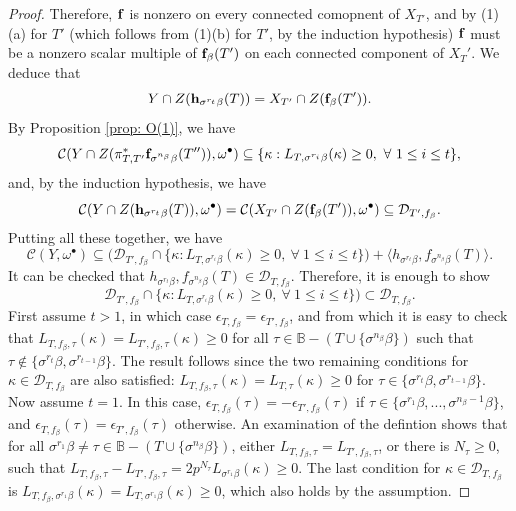 \documentclass[11pt,pdflatex]{amsart}
\theoremstyle{plain}
\theoremstyle{definition}
\theoremstyle{plain}
\theoremstyle{definition}
\theoremstyle{remark}
\numberwithin{equation}{section}
\numberwithin{figure}{section} \numberwithin{table}{subsection}
\newcommand{\calC}{{\mathcal{C}}}
\newcommand{\calD}{{\mathcal{D}}}
\def\BB{\mathbb{B}}
\begin{document}
\begin{proof}
 Therefore,  $\bf f$ is nonzero on every connected comopnent of $X_{T'}$, and by (1)(a) for $T'$ (which follows from  (1)(b) for $T'$, by the induction hypothesis) $\bf f$ must be a nonzero scalar multiple of ${\bf f}_\beta(T')$ on each connected component of $X_T'$. We deduce that  $$Y\cap Z({\bf h}_{\sigma^{r_t}\beta}(T))=X_{T'} \cap Z({\bf f}_\beta(T')).$$
  By Proposition \ref{prop: O(1)}, we have 
$$\calC(Y \cap Z(\pi_{T,T'}^*{\bf f}_{\sigma^{n_\beta}\beta}(T'')),\omega^\bullet) \subseteq  \{\kappa: L_{T,\sigma^{r_i}\beta}(\kappa)\geq 0,\ \forall \ 1 \leq i \leq t\},$$  
and, by the induction hypothesis, we have  $$\calC(Y\cap Z({\bf h}_{\sigma^{r_t}\beta}(T)),\omega^\bullet)=\calC(X_{T'} \cap Z({\bf f}_\beta(T')),\omega^\bullet) \subseteq\calD_{T',f_\beta}.$$ Putting all these together, we have 
$$\calC(Y,\omega^\bullet) \subseteq  \big( \calD_{T',f_\beta} \cap   \{\kappa: L_{T,\sigma^{r_i}\beta}(\kappa)\geq 0,\ \forall \ 1 \leq i \leq t\}\big) +\langle h_{\sigma^{r_t}\beta}, f_{\sigma^{n_\beta}\beta}(T) \rangle.$$ 
It can be checked that $h_{\sigma^{r_t}\beta}, f_{\sigma^{n_\beta}\beta}(T) \in \calD_{T,f_\beta}$. Therefore, it is enough to show $$\calD_{T',f_\beta} \cap   \{\kappa: L_{T,\sigma^{r_i}\beta}(\kappa)\geq 0,\ \forall \ 1 \leq i \leq t\}\big)  \subset \calD_{T,f_\beta}.$$
First assume $t>1$, in which case $\epsilon_{T,f_\beta}=\epsilon_{T',f_\beta}$, and from which it  is easy to check that $L_{T,f_\beta,\tau}(\kappa)=L_{T',f_\beta,\tau}(\kappa)\geq 0$ for all $\tau \in \BB-(T\cup\{\sigma^{n_\beta}\beta\})$ such that $\tau \not \in \{\sigma^{r_t}\beta, \sigma^{r_{t-1}}\beta\}$. The result follows since the two remaining conditions for $\kappa\in \calD_{T,f_\beta}$ are also satisfied: $L_{T,f_\beta,\tau}(\kappa)=L_{T,\tau}(\kappa)\geq 0$ for $\tau \in \{\sigma^{r_t}\beta, \sigma^{r_{t-1}}\beta\}$. Now assume $t=1$. In this case, $\epsilon_{T,f_\beta}(\tau)=-\epsilon_{T',f_\beta}(\tau)$ if $\tau \in \{\sigma^{r_1}\beta,...,\sigma^{n_\beta-1}\beta\}$, and $\epsilon_{T,f_\beta}(\tau)=\epsilon_{T',f_\beta}(\tau)$ otherwise. An examination of the defintion shows that for all $\sigma^{r_1}\beta \neq \tau  \in \BB-(T\cup\{\sigma^{n_\beta}\beta\})$, either $L_{T,f_\beta,\tau}=L_{T',f_\beta,\tau}$, or there is $N_\tau \geq 0$, such that  $L_{T,f_\beta,\tau}-L_{T',f_\beta,\tau}=2p^{N_\tau} L_{\sigma^{r_1}\beta}(\kappa)\geq 0$. The last condition for $\kappa\in \calD_{T,f_\beta}$ is $L_{T,f_\beta,\sigma^{r_1}\beta}(\kappa)=L_{T,\sigma^{r_1}\beta}(\kappa) \geq 0$, which also holds by the assumption.

 


\end{proof}
\end{document}
